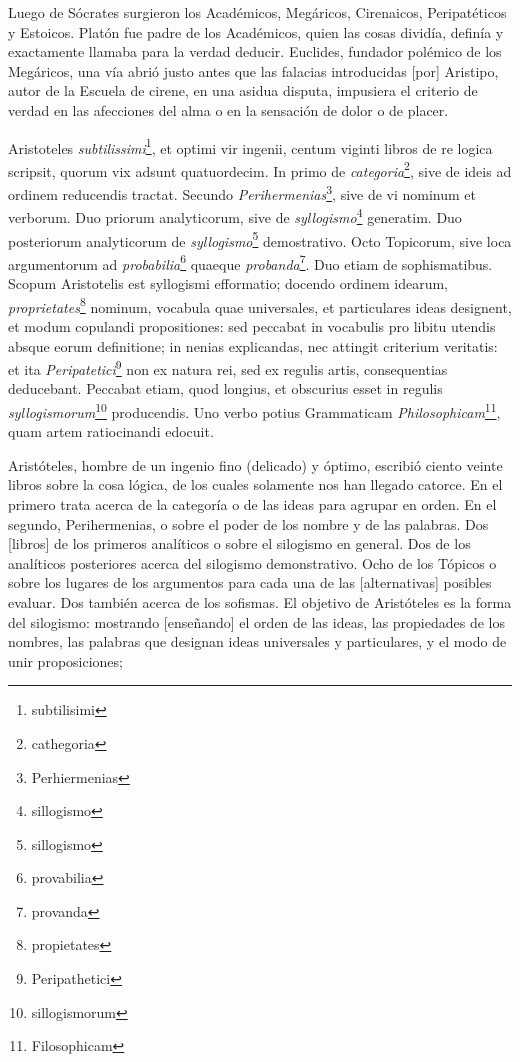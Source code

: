 \documentclass{article}
\begin{document}
\begin{paracol}{2}
\begin{nthcolumn*}{0}
\end{nthcolumn*}
\vspace{0.5cm}
\begin{nthcolumn}{1} %
Luego de Sócrates surgieron los Académicos, Megáricos, Cirenaicos, Peripatéticos y Estoicos. Platón fue padre de los Académicos, quien las cosas dividía, definía y exactamente llamaba para la verdad deducir. Euclides, fundador polémico de los Megáricos, una vía abrió justo antes que las falacias introducidas [por] Aristipo, autor de la Escuela de cirene, en una asidua disputa, impusiera el criterio de verdad en las afecciones del alma o en la sensación de dolor o de placer.
\end{nthcolumn}
\vspace{0.5cm}
\begin{nthcolumn*}{0} %
Aristoteles \emph{subtilissimi}\footnote{subtilisimi}, et optimi vir ingenii, centum viginti libros de re logica scripsit, quorum vix adsunt quatuordecim. In primo de \emph{categoria}\footnote{cathegoria}, sive de ideis ad ordinem reducendis tractat. Secundo \emph{Perihermenias}\footnote{Perhiermenias}, sive de vi nominum et verborum. Duo priorum analyticorum, sive de \emph{syllogismo}\footnote{sillogismo} generatim. Duo posteriorum analyticorum de \emph{syllogismo}\footnote{sillogismo} demostrativo. Octo Topicorum, sive loca argumentorum ad \emph{probabilia}\footnote{provabilia} quaeque \emph{probanda}\footnote{provanda}. Duo etiam de sophismatibus. Scopum Aristotelis est syllogismi efformatio; docendo ordinem idearum, \emph{proprietates}\footnote{propietates} nominum, vocabula quae universales, et particulares ideas designent, et modum copulandi propositiones: sed peccabat in vocabulis pro libitu utendis absque eorum definitione; in nenias explicandas, nec attingit criterium veritatis: et ita \emph{Peripatetici}\footnote{Peripathetici} non ex natura rei, sed ex regulis artis, consequentias deducebant. Peccabat etiam, quod longius, et obscurius esset in regulis \emph{syllogismorum}\footnote{sillogismorum} producendis. Uno verbo potius Grammaticam \emph{Philosophicam}\footnote{Filosophicam}, quam artem ratiocinandi edocuit.
\end{nthcolumn*}
\vspace{0.5cm}
\begin{nthcolumn}{1} %
Aristóteles, hombre de un ingenio fino (delicado) y óptimo, escribió ciento veinte libros sobre la cosa lógica, de los cuales solamente nos han llegado catorce. En el primero trata acerca de la categoría o de las ideas para agrupar en orden. En el segundo, Perihermenias, o sobre el poder de los nombre y de las palabras. Dos [libros] de los primeros analíticos o sobre el silogismo en general. Dos de los analíticos posteriores acerca del silogismo demonstrativo. Ocho de los Tópicos o sobre los lugares de los argumentos para cada una de las [alternativas] posibles evaluar. Dos también acerca de los sofismas. El objetivo de Aristóteles es la forma del silogismo: mostrando [enseñando] el orden de las ideas, las propiedades de los nombres, las palabras que designan ideas universales y particulares, y el modo de unir proposiciones; 

\end{nthcolumn}
\end{paracol}
\end{document}
